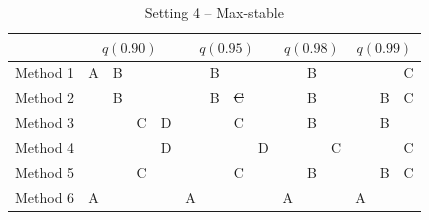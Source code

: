 \documentclass[useAMS,usenatbib,referee]{biomweb}
\providecommand{\DIFadd}[1]{{\protect\color{blue}\uwave{#1}}} %
\providecommand{\DIFdel}[1]{{\protect\color{red}\sout{#1}}}                      %
\providecommand{\DIFaddFL}[1]{\DIFadd{#1}} %
\providecommand{\DIFdelFL}[1]{\DIFdel{#1}} %
\providecommand{\DIFaddbeginFL}{} %
\providecommand{\DIFaddendFL}{} %
\providecommand{\DIFdelbeginFL}{} %
\providecommand{\DIFdelendFL}{} %
\begin{document}
\begin{table}[htbp]
  \centering
  \caption{Setting 4 -- Max-stable}
  \DIFdelbeginFL %
\DIFdelendFL \DIFaddbeginFL \label{sttbl:mssim}
  \DIFaddendFL \begin{tabular}{|l|cccc|cccc|ccc|ccc|}
    \cline{2-15}
    \multicolumn{1}{c}{} & \multicolumn{4}{|c}{$q(0.90)$} & \multicolumn{4}{|c}{$q(0.95)$} & \multicolumn{3}{|c}{$q(0.98)$} & \multicolumn{3}{|c|}{$q(0.99)$} \\
    \hline
    Method 1 & A & B &   &   &   & B &   &   &   & B &   &   &   & C \\
    \hline
    Method 2 &   & B &   &   &   & B &   \DIFdelbeginFL \DIFdelFL{C }\DIFdelendFL &   &   & B &   &   & B & C \\
    \hline
    Method 3 &   &   & C & D &   &   & C &   &   & B &   &   & B &   \\
    \hline
    Method 4 &   &   &   & D &   &   &   & D &   &   & C &   &   & C \\
    \hline
    Method 5 &   &   & C &   &   & \DIFaddbeginFL \DIFaddFL{B }\DIFaddendFL & C &   &   & B &   &   & B & C \\
    \hline
    Method 6 & A &   &   &   & A &   &   &   & A &   &   & A &   &   \\
    \hline
  \end{tabular}
\end{table}
\end{document}
